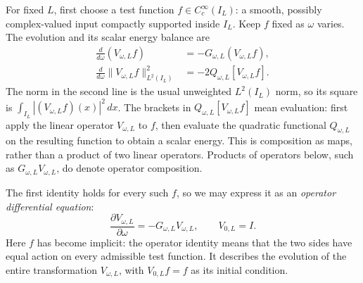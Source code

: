 For fixed $L$, first choose a test function $f\in C_c^\infty(I_L)$:
a smooth, possibly complex-valued input compactly supported inside
$I_L$. Keep $f$ fixed as $\omega$ varies. The evolution and its
scalar energy balance are
\begin{equation}
\begin{aligned}
\frac{d}{d\omega}(V_{\omega,L}f)
&=-G_{\omega,L}(V_{\omega,L}f),\\
\frac{d}{d\omega}\lVert V_{\omega,L}f\rVert_{L^2(I_L)}^2
&=-2Q_{\omega,L}[V_{\omega,L}f].
\end{aligned}
\label{eq:rh-energy-derivative}
\end{equation}
The norm in the second line is the usual unweighted $L^2(I_L)$ norm,
so its square is $\int_{I_L}|(V_{\omega,L}f)(x)|^2\,dx$.
The brackets in $Q_{\omega,L}[V_{\omega,L}f]$ mean evaluation:
first apply the linear operator $V_{\omega,L}$ to $f$, then evaluate
the quadratic functional $Q_{\omega,L}$ on the resulting function
to obtain a scalar energy. This is composition as maps, rather than
a product of two linear operators. Products of operators below,
such as $G_{\omega,L}V_{\omega,L}$, do denote operator composition.

The first identity holds for every such $f$, so we may express it
as an \emph{operator differential equation}:
\[
\boxed{\frac{\partial V_{\omega,L}}{\partial\omega}
=-G_{\omega,L}V_{\omega,L},\qquad V_{0,L}=I.}
\]
Here $f$ has become implicit: the operator identity means that the
two sides have equal action on every admissible test function.
It describes the evolution of the entire transformation
$V_{\omega,L}$, with $V_{0,L}f=f$ as its initial condition.

